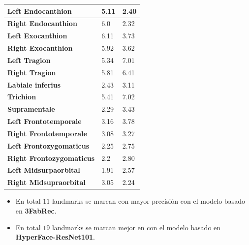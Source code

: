 \begin{table}[!ht]
\begin{tabular}{|l|l|l|}
                    \textbf{Left Endocanthion} & 5.11 & \cellcolor{green!25}2.40 \\ \hline
                    \textbf{Right Endocanthion} & 6.0 & \cellcolor{green!25}2.32 \\ \hline
                    \textbf{Left Exocanthion} & 6.11 & \cellcolor{green!25}3.73 \\ \hline
                    \textbf{Right Exocanthion} & 5.92 & \cellcolor{green!25}3.62 \\ \hline
                    \textbf{Left Tragion} & \cellcolor{green!25}5.34 & 7.01 \\ \hline
                    \textbf{Right Tragion} & \cellcolor{green!25}5.81 & 6.41 \\ \hline
                    \textbf{Labiale inferius} & \cellcolor{green!25}2.43 & 3.11 \\ \hline
                    \textbf{Trichion} & \cellcolor{green!25}5.41 & 7.02 \\ \hline
                    \textbf{Supramentale} & \cellcolor{green!25}2.29 & 3.43 \\ \hline
                    \textbf{Left Frontotemporale} & \cellcolor{green!25}3.16 & 3.78 \\ \hline
                    \textbf{Right Frontotemporale} & \cellcolor{green!25}3.08 & 3.27 \\ \hline
                    \textbf{Left Frontozygomaticus} & \cellcolor{green!25}2.25 & 2.75 \\ \hline
                    \textbf{Right Frontozygomaticus} & \cellcolor{green!25}2.2 & 2.80 \\ \hline
                    \textbf{Left Midsurpaorbital} & \cellcolor{green!25}1.91 & 2.57 \\ \hline
                    \textbf{Right Midsupraorbital} & 3.05 & \cellcolor{green!25}2.24 \\ \hline
                \end{tabular}
                \label{table:comparativa-Landmarks}
            \end{table}

            \medskip
            
            \begin{itemize}
                \item En total $11$ landmarks se marcan con mayor precisión con el modelo basado en \textbf{3FabRec}.
                \item En total $19$ landmarks se marcan mejor en con el modelo basado en \textbf{HyperFace-ResNet101}.
            \end{itemize}

